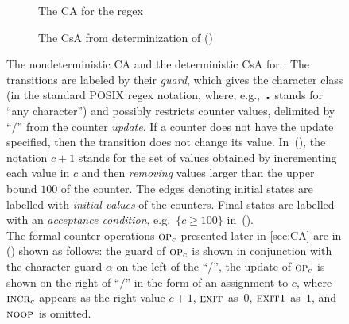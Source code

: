 \documentclass[acmsmall,screen]{acmart}
\begin{document}
\begin{figure}[t]
  \begin{subfigure}[b]{0.45\linewidth}
  \scalebox{0.8}{
    \hspace*{-4mm}
    
  }
  \vspace*{3mm}
  \caption{The CA for the regex }
  \label{fig:ak:nondet}
  \end{subfigure}
  \hfill
  \begin{subfigure}[b]{0.54\linewidth}
  \scalebox{0.8}{
    \hspace*{-4mm}
    
  }
  \caption{The CsA from determinization of ()}
  \label{fig:ak:det}
  \end{subfigure}
\begin{center}
\end{center}
\vspace{-6mm}
\caption{
  The nondeterministic CA and the deterministic CsA for {}.
  The transitions are labeled by their \emph{guard}, which gives the character
  class (in the standard POSIX regex notation, where, e.g.,~$\DOT$ stands for ``any
  character'') and possibly restricts counter values, delimited by ``$/$'' from the counter
  \emph{update}. If a counter does not have the update specified, then the
  transition does not change its value. In~(), the
  notation $c+1$ stands for the set of values obtained by incrementing each
  value in $c$ and then \emph{removing} values larger than the upper bound $100$
  of the counter. The edges denoting initial states are labelled with
  \emph{initial values} of the counters. Final states are labelled with
  an \emph{acceptance condition}, e.g.~$\{c \geq 100\}$ in~().
  \\
  The formal counter operations $\Op[c]$ presented later in  \cref{sec:CA} are
  in () shown as follows: the guard of $\Op[c]$ is shown
  in conjunction with the character guard $\alpha$ on the left of the ``/'', the
  update of $\Op[c]$ is shown on the right of ``$/$'' in the form of an
  assignment to $c$, where $\IncrOp[c]$ appears as the right value $c+1$,
  $\ExitOp$ as~$0$, $\ExitIncrOp$ as~$1$, and $\NoOp$ is omitted.
\vspace{-2mm}
}
\label{fig:ak}
\end{figure}

\vspace{-0.0mm}
\end{document}
